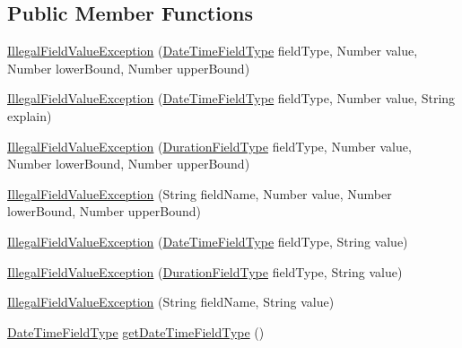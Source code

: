 \subsection*{Public Member Functions}
\begin{DoxyCompactItemize}
\item 
\hyperlink{classorg_1_1joda_1_1time_1_1_illegal_field_value_exception_a60881e696a2c3290259c287ada6d0662}{Illegal\-Field\-Value\-Exception} (\hyperlink{classorg_1_1joda_1_1time_1_1_date_time_field_type}{Date\-Time\-Field\-Type} field\-Type, Number value, Number lower\-Bound, Number upper\-Bound)
\item 
\hyperlink{classorg_1_1joda_1_1time_1_1_illegal_field_value_exception_afe818a23a7f23ab888f3efcfef814d02}{Illegal\-Field\-Value\-Exception} (\hyperlink{classorg_1_1joda_1_1time_1_1_date_time_field_type}{Date\-Time\-Field\-Type} field\-Type, Number value, String explain)
\item 
\hyperlink{classorg_1_1joda_1_1time_1_1_illegal_field_value_exception_ad41aea2a3f1d4b959ef9f34b15e4802d}{Illegal\-Field\-Value\-Exception} (\hyperlink{classorg_1_1joda_1_1time_1_1_duration_field_type}{Duration\-Field\-Type} field\-Type, Number value, Number lower\-Bound, Number upper\-Bound)
\item 
\hyperlink{classorg_1_1joda_1_1time_1_1_illegal_field_value_exception_a4e6c296bd5eaaa184e7310978859c246}{Illegal\-Field\-Value\-Exception} (String field\-Name, Number value, Number lower\-Bound, Number upper\-Bound)
\item 
\hyperlink{classorg_1_1joda_1_1time_1_1_illegal_field_value_exception_a77c16f6df040c3fff3c1db8a9e25c17b}{Illegal\-Field\-Value\-Exception} (\hyperlink{classorg_1_1joda_1_1time_1_1_date_time_field_type}{Date\-Time\-Field\-Type} field\-Type, String value)
\item 
\hyperlink{classorg_1_1joda_1_1time_1_1_illegal_field_value_exception_af92b423542e8f8bbea1dda82afdb76bc}{Illegal\-Field\-Value\-Exception} (\hyperlink{classorg_1_1joda_1_1time_1_1_duration_field_type}{Duration\-Field\-Type} field\-Type, String value)
\item 
\hyperlink{classorg_1_1joda_1_1time_1_1_illegal_field_value_exception_a157e03bf2b2366b29d6b7f35792f0a13}{Illegal\-Field\-Value\-Exception} (String field\-Name, String value)
\item 
\hyperlink{classorg_1_1joda_1_1time_1_1_date_time_field_type}{Date\-Time\-Field\-Type} \hyperlink{classorg_1_1joda_1_1time_1_1_illegal_field_value_exception_ace9f462d8eea16fecb0c766b721c9cc0}{get\-Date\-Time\-Field\-Type} ()

\end{DoxyCompactItemize}
